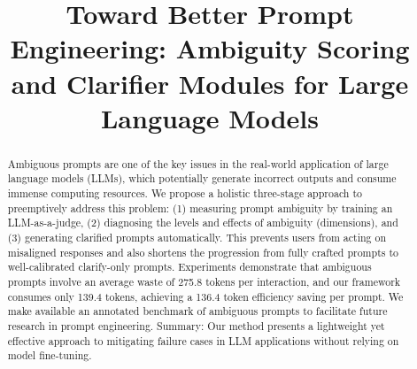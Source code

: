 \documentclass[conference]{IEEEtran}
\begin{document}
%
\title{Toward Better Prompt Engineering: Ambiguity Scoring and Clarifier Modules for Large Language Models}


\author{
\and
{}
}

\maketitle

\begin{abstract}
Ambiguous prompts are one of the key issues in the real-world application of large language models (LLMs), which potentially generate incorrect outputs and consume immense computing resources. We propose a holistic three-stage approach to preemptively address this problem: (1) measuring prompt ambiguity by training an LLM-as-a-judge, (2) diagnosing the levels and effects of ambiguity (dimensions), and (3) generating clarified prompts automatically. This prevents users from acting on misaligned responses and also shortens the progression from fully crafted prompts to well-calibrated clarify-only prompts. Experiments demonstrate that ambiguous prompts involve an average waste of 275.8 tokens per interaction, and our framework consumes only 139.4 tokens, achieving a 136.4 token efficiency saving per prompt. We make available an annotated benchmark of ambiguous prompts to facilitate future research in prompt engineering. Summary: Our method presents a lightweight yet effective approach to mitigating failure cases in LLM applications without relying on model fine-tuning.
\end{abstract}
\end{document}
